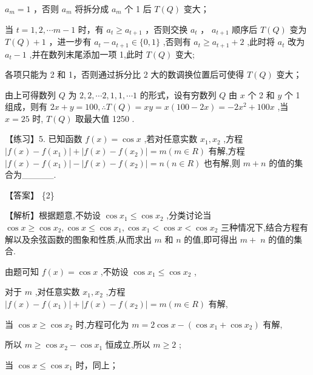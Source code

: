 \documentclass[10pt]{article}
\newcommand*\circled[1]{\tikz[baseline=(char.base)]{\node[shape=circle,draw,inner sep=1.5pt] (char) {\small #1};}}
\begin{document}
 \circled{2}  \({a}_{m} = 1\) ，否则 \({a}_{m}\) 将拆分成 \({a}_{m}\) 个 1 后 \(T\left( Q\right)\) 变大；

 \circled{3}  当 \(t = 1,2,\cdots m - 1\) 时，有 \({a}_{t} \geq  {a}_{t + 1}\) ，否则交换 \({a}_{t}\) ， \({a}_{t + 1}\) 顺序后 \(T\left( Q\right)\) 变为 \(T\left( Q\right)  + 1\) ，进一步有 \({a}_{t} - {a}_{t + 1} \in  \{ 0,1\}\) ,否则有 \({a}_{t} \geq  {a}_{t + 1} + 2\) ,此时将 \({a}_{t}\) 改为 \({a}_{t} - 1\) ,并在数列末尾添加一项 1,此时 \(T\left( Q\right)\) 变大;

 \circled{4}  各项只能为 2 和 1，否则通过拆分比 2 大的数调换位置后可使得 \(T\left( Q\right)\) 变大；

 \circled{5} 由上可得数列 \(Q\) 为 \(2,2,\cdots 2,1,1,\cdots 1\) 的形式，设有穷数列 \(Q\) 由 \(x\) 个 2 和 \(y\) 个 1 组成，则有 \({2x} + y = {100},\therefore T\left( Q\right)  = {xy} = x\left( {{100} - {2x}}\right)  =  - 2{x}^{2} + {100x}\) ,当 \(x = {25}\) 时, \(T\left( Q\right)\) 取最大值 1250 .

【练习】5. 已知函数 \(f\left( x\right)  = \cos x\) ,若对任意实数 \({x}_{1},{x}_{2}\) ,方程 \(\left| {f\left( x\right)  - f\left( {x}_{1}\right) }\right|  + \left| {f\left( x\right)  - f\left( {x}_{2}\right) }\right|  = m\left( {m \in  R}\right)\) 有解,方程 \(\left| {f\left( x\right)  - f\left( {x}_{1}\right) }\right|  - \left| {f\left( x\right)  - f\left( {x}_{2}\right) }\right|  = n\left( {n \in  R}\right)\) 也有解,则 \(m + n\) 的值的集合为\_\_\_\_\_.

【答案】 \{2\}

【解析】根据题意,不妨设 \(\cos {x}_{1} \leq  \cos {x}_{2}\) ,分类讨论当 \(\cos x \geq  \cos {x}_{2},\cos x \leq  \cos {x}_{1},\cos {x}_{1} < \cos x < \cos {x}_{2}\) 三种情况下,结合方程有解以及余弦函数的图象和性质,从而求出 \(m\) 和 \(n\) 的值,即可得出 \(m + \; n\) 的值的集合.

由题可知 \(f\left( x\right)  = \cos x\) ,不妨设 \(\cos {x}_{1} \leq  \cos {x}_{2}\) ,

对于 \(m\) ,对任意实数 \({x}_{1},{x}_{2}\) ,方程 \(\left| {f\left( x\right)  - f\left( {x}_{1}\right) }\right|  + \left| {f\left( x\right)  - f\left( {x}_{2}\right) }\right|  = m\left( {m \in  R}\right)\) 有解,

当 \(\cos x \geq  \cos {x}_{2}\) 时,方程可化为 \(m = 2\cos x - \left( {\cos {x}_{1} + \cos {x}_{2}}\right)\) 有解,

所以 \(m \geq  \cos {x}_{2} - \cos {x}_{1}\) 恒成立,所以 \(m \geq  2\) ;

当 \(\cos x \leq  \cos {x}_{1}\) 时，同上；
\end{document}
